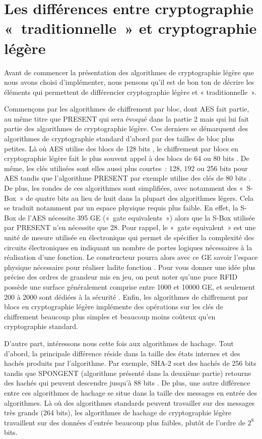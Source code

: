 	\section{Les différences entre cryptographie « traditionnelle » et cryptographie légère}

			Avant de commencer la présentation des algorithmes de cryptographie légère que
		nous avons choisi d'implémenter, nous pensons qu'il est de bon ton de décrire
		les éléments qui permettent de différencier cryptographie légère et «
		traditionnelle ».

			Commençons par les algorithmes de chiffrement par bloc, dont AES fait partie,
		au même titre que PRESENT qui sera évoqué dans la partie 2 mais qui lui fait
		partie des algorithmes de cryptographie légère. Ces derniers se démarquent des
		algorithmes de cryptographie standard d'abord par des tailles de bloc plus
		petites. Là où AES utilise des blocs de 128 bits \cite{AES-FIPS}, le
		chiffrement par blocs en cryptographie légère fait le plus souvent appel à des
		blocs de 64 ou 80 bits \cite{Report_light}. De même, les clés utilisées sont
		elles aussi plus courtes : 128, 192 ou 256 bits pour AES \cite{AES-FIPS}
		tandis que l'algorithme PRESENT par exemple utilise des clés de 80 bits
		\cite{PRESENT}. De plus, les rondes de ces algorithmes sont simplifiées, avec
		notamment des « S-Box » de quatre bits au lieu de huit dans la plupart des
		algorithmes légers. Cela se traduit notamment par un espace physique requis
		plus faible. En effet, la S-Box de l'AES nécessite 395 GE \cite{RFID} (« gate
		equivalents ») alors que la S-Box utilisée par PRESENT n'en nécessite que 28.
		Pour rappel, le « gate equivalent » est une unité de mesure utilisée en
		électronique qui permet de spécifier la complexité des circuits électroniques
		en indiquant un nombre de portes logiques nécessaires à la réalisation d'une
		fonction. Le constructeur pourra alors avec ce GE savoir l'espace physique
		nécessaire pour réaliser ladite fonction \cite{wiki_gate}. Pour vous donner
		une idée plus précise des ordres de grandeur mis en jeu, on peut noter qu'une
		puce RFID possède une surface généralement comprise entre 1000 et 10000 GE, et
		seulement 200 à 2000 sont dédiées à la sécurité \cite{Report_light}. Enfin,
		les algorithmes de chiffrement par blocs en cryptographie légère implémente
		des opérations sur les clés de chiffrement beaucoup plus simples et beaucoup
		moins coûteux qu'en cryptographie standard.

			D'autre part, intéressons nous cette fois aux algorithmes de hachage. Tout
		d'abord, la principale différence réside dans la taille des états internes et
		des hachés produits par l'algorithme. Par exemple, SHA-2 sort des hachés de
		256 bits tandis que SPONGENT (algorithme présenté dans la deuxième partie)
		retourne des hachés qui peuvent descendre jusqu'à 88 bits \cite{6275435}. De
		plus, une autre différence entre ces algorithmes de hachage se situe dans la
		taille des messages en entrée des algorithmes. Là où des algorithmes standards
		peuvent travailler sur des messages très grands (264 bits), les algorithmes de
		hachage de cryptographie légère travaillent sur des données d'entrée beaucoup
		plus faibles, plutôt de l'ordre de $2^8$ bits.

